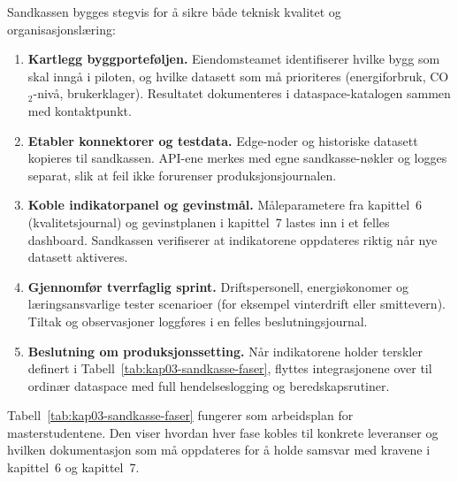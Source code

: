 Sandkassen bygges stegvis for å sikre både teknisk kvalitet og organisasjonslæring:
\begin{enumerate}
    \item \textbf{Kartlegg byggporteføljen.} Eiendomsteamet identifiserer hvilke bygg som skal inngå i piloten, og hvilke datasett som må prioriteres (energiforbruk, CO$_2$-nivå, brukerklager). Resultatet dokumenteres i dataspace-katalogen sammen med kontaktpunkt.
    \item \textbf{Etabler konnektorer og testdata.} Edge-noder og historiske datasett kopieres til sandkassen. API-ene merkes med egne sandkasse-nøkler og logges separat, slik at feil ikke forurenser produksjonsjournalen.
    \item \textbf{Koble indikatorpanel og gevinstmål.} Måleparametere fra kapittel~6 (kvalitetsjournal) og gevinstplanen i kapittel~7 lastes inn i et felles dashboard. Sandkassen verifiserer at indikatorene oppdateres riktig når nye datasett aktiveres.
    \item \textbf{Gjennomfør tverrfaglig sprint.} Driftspersonell, energiøkonomer og læringsansvarlige tester scenarioer (for eksempel vinterdrift eller smittevern). Tiltak og observasjoner loggføres i en felles beslutningsjournal.
    \item \textbf{Beslutning om produksjonssetting.} Når indikatorene holder terskler definert i Tabell~\ref{tab:kap03-sandkasse-faser}, flyttes integrasjonene over til ordinær dataspace med full hendelseslogging og beredskapsrutiner.
\end{enumerate}

Tabell~\ref{tab:kap03-sandkasse-faser} fungerer som arbeidsplan for masterstudentene. Den viser hvordan hver fase kobles til konkrete leveranser og hvilken dokumentasjon som må oppdateres for å holde samsvar med kravene i kapittel~6 og kapittel~7.


